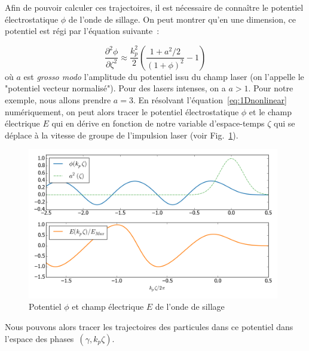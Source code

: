 \documentclass[a4paper]{book}
\begin{document}
Afin de pouvoir calculer ces trajectoires, il est nécessaire de connaître le potentiel électrostatique $\phi$ de l'onde de sillage. On peut montrer qu'en une dimension, ce potentiel est régi par l'équation suivante~:

\begin{equation}
    \frac{\partial^2 \phi}{\partial \zeta ^2 }\approx\frac{k_p^2}{2}\left(\frac{1+a^2/2}{(1+\phi)^2}-1\right)
    \label{eq:1Dnonlinear}
\end{equation}
où $a$ est \textit{grosso modo} l'amplitude du potentiel issu du champ laser (on l'appelle le "potentiel vecteur normalisé"). Pour des lasers intenses, on a $a>1$. Pour notre exemple, nous allons prendre $a=3$. En résolvant l'équation~\ref{eq:1Dnonlinear} numériquement, on peut alors tracer le potentiel électrostatique $\phi$ et le champ électrique $E$ qui en dérive en fonction de notre variable d'espace-temps $\zeta$ qui se déplace à la vitesse de groupe de l'impulsion laser (voir Fig.~\ref{fig:1D_pot_field}). 


\begin{figure}[!htbp]
\begin{center}
\includegraphics[width=11cm]{pictures/1D_Field_and_Potential.png}
\end{center}
\caption{Potentiel $\phi$ et champ électrique $E$ de l'onde de sillage}
\label{fig:1D_pot_field}
\end{figure}

Nous pouvons alors tracer les trajectoires des particules dans ce potentiel dans l'espace des phases~$(\gamma, k_p\zeta)$.
\end{document}
